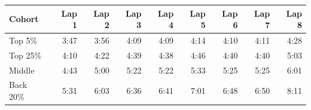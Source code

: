 \begin{tabular}{lrrrrrrrr}
\toprule
\textbf{Cohort} & \multicolumn{1}{r}{\textbf{Lap 1}} & \multicolumn{1}{r}{\textbf{Lap 2}} & \multicolumn{1}{r}{\textbf{Lap 3}} & \multicolumn{1}{r}{\textbf{Lap 4}} & \multicolumn{1}{r}{\textbf{Lap 5}} & \multicolumn{1}{r}{\textbf{Lap 6}} & \multicolumn{1}{r}{\textbf{Lap 7}} & \multicolumn{1}{r}{\textbf{Lap 8}} \\
\midrule
Top 5\% & 3:47 & 3:56 & 4:09 & 4:09 & 4:14 & 4:10 & 4:11 & 4:28 \\
Top 25\% & 4:10 & 4:22 & 4:39 & 4:38 & 4:46 & 4:40 & 4:40 & 5:03 \\
Middle & 4:43 & 5:00 & 5:22 & 5:22 & 5:33 & 5:25 & 5:25 & 6:01 \\
Back 20\% & 5:31 & 6:03 & 6:36 & 6:41 & 7:01 & 6:48 & 6:50 & 8:11 \\
\bottomrule
\end{tabular}